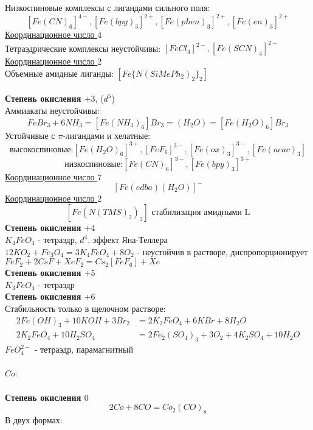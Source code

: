 Низкоспиновые комплексы с лигандами сильного поля: 
\[
\left[Fe(CN)_6 \right]^{4-}, \left[Fe(bpy)_3 \right]^{2+}, \left[Fe(phen)_3 \right]^{2+}, \left[Fe(en)_3 \right]^{2+}
\]
\ul{Координационное число $4$} \\
Тетраэдрические комплексы неустойчивы: $ \left[FeCl_4\right]^{2-}, \left[Fe(SCN)_4 \right]^{2-}$ \\
\ul{Координационное число $2$} \\
Объемные амидные лиганды: $\left[ Fe\{ N (SiMePh_2)_2 \}_2 \right]$ \\ \\
\textbf{Степень окисления $+3$}, ($d^5$)\\
Аммиакаты неустойчивы:
\[
FeBr_3 + 6NH_3 = \left[Fe(NH_3)_6\right]Br_3 = (H_2O) = \left[Fe(H_2O)_6\right]Br_3  
\]
Устойчивые с $\pi$-лигандами и хелатные:
\[
\text{высокоспиновые:} \left[Fe(H_2O)_6\right]^{3+}, \left[FeF_6\right]^{3-}, \left[Fe(ox)_3\right]^{3-}, \left[Fe(acac)_3\right] 
\]
\[
\text{низкоспиновые:} \left[Fe(CN)_6\right]^{3-}, \left[Fe(bpy)_3\right]^{3+}
\]
\ul{Координационное число $7$} \\
\[
\left[Fe(edba)(H_2O)\right]^{-}
\]
\ul{Координационное число $2$} \\
\[
\left[Fe(N(TMS)_2)_3\right] \text{ стабилизация амидными L}
\]
\textbf{Степень окисления $+4$} \\
$K_4FeO_4$ - тетраэдр, $d^4$, эффект Яна-Теллера \\
$12 KO_2 + Fe_3O_4 = 3K_4FeO_4 + 8 O_2$ - неустойчив в растворе, диспропорционирует \\
$FeF_2 + 2 CsF + XeF_2 = Cs_2\left[FeF_6 \right] + Xe$	\\ 
\textbf{Степень окисления $+5$} \\
$K_3FeO_4$ - тетраэдр \\
\textbf{Степень окисления $+6$} \\
Стабильность только в щелочном растворе:
\begin{align*}
2 Fe(OH)_3 + 10 KOH + 3 Br_2 &= 2K_2FeO_4 + 6KBr + 8H_2O \\
2K_2FeO_4 + 10H_2SO_4 &= 2Fe_2(SO_4)_3 + 3O_2 + 4K_2SO_4 + 10H_2O
\end{align*}
$FeO_4^{2-}$ - тетраэдр, парамагнитный \\ \\
$Co$: \\ \\
\textbf{Степень окисления $0$} \\
\[
2Co + 8CO = Co_2(CO)_8
\]
В двух формах:
\begin{figure} [H]
	\centering {\texttt{[image: ww2]}}
\end{figure}
